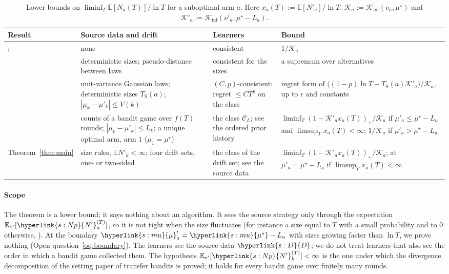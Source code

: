 \documentclass[11pt]{article}
\newcommand{\sy}[2]{\hyperlink{#1}{#2}}
\newcommand{\E}{\mathbb{E}}
\newcommand{\mean}{\sy{s:mu}{\mu}}
\newcommand{\ms}{\sy{s:mu}{\mu^{\star}}}
\newcommand{\Np}{\sy{s:Np}{N'}}
\newcommand{\Dd}{\sy{s:D}{D}}
\begin{document}
\begin{table}[t]
\centering\small
\caption{Lower bounds on $\liminf_T\E[N_a(T)]/\ln T$ for a suboptimal arm $a$. Here
$x_a(T):=\E[N'_a]/\ln T$, $\mathcal K_a:=\mathcal K_{\inf}(\nu_a,\mu^\star)$ and
$\mathcal K'_a:=\mathcal K_{\inf}(\nu'_a,\mu^\star-L_a)$.}\label{tab:comparison}
\begin{tabular}{@{}p{}p{}p{}p{}@{}}
\toprule
\raggedright Result & \raggedright Source data and drift & \raggedright Learners & Bound \\
\midrule
\raggedright \citet{LR85,BK96}; \citet[Thm.~1]{GMS19} & \raggedright none & \raggedright consistent
& $1/\mathcal K_a$ \\
\raggedright \citet[Thm.~3]{PMM25} & \raggedright deterministic sizes; pseudo-distance between laws
& \raggedright consistent for the sizes & a supremum over alternatives \\
\raggedright \citet[Thm.~3]{CL24} & \raggedright unit-variance Gaussian laws; deterministic sizes
$T_{\mathrm S}(a)$; $|\mu_k-\mu'_k|\le V(k)$ & \raggedright $(C,p)$-consistent: regret $\le CT^p$
on the class & regret form of $\big((1-p)\ln T-T_{\mathrm S}(a)\mathcal K'_{a}\big)/\mathcal K_a$, up
to $\epsilon$ and constants \\
\raggedright \citet[Thm.~2]{PMRM26} & \raggedright counts of a bandit game over $f(T)$ rounds;
$|\mu_k-\mu'_k|\le L_k$; a unique optimal arm, arm $1$ ($\mu_1=\mu^\star$) & \raggedright the
class $\mathcal C_L$; see the ordered prior history &
$\liminf_T(1-\mathcal K'_ax_a(T))_+/\mathcal K_a$ if $\mu'_a\le\mu^\star-L_a$ and
$\limsup_Tx_a(T)<\infty$; $1/\mathcal K_a$ if $\mu'_a>\mu^\star-L_a$ \\
\raggedright Theorem~\ref{thm:main} & \raggedright size rules, $\E N'_k<\infty$; four drift sets,
one- or two-sided & \raggedright the class of the drift set; see the source data &
$\liminf_T(1-\mathcal K'_ax_a(T))_+/\mathcal K_a$; at $\mu'_a=\mu^\star-L_a$ if
$\limsup_Tx_a(T)<\infty$ \\
\bottomrule
\end{tabular}
\end{table}

\paragraph{Scope} The theorem is a lower bound; it says nothing about an algorithm. It sees the
source strategy only through the expectation $\E_{\nu'}[\Np^{(T)}_a]$, so it is not tight when the
size fluctuates (for instance a size equal to $T$ with a small probability and to $0$ otherwise,
\citealp[Section~4.2]{PMRM26}). At the boundary $\mean'_a=\ms-L_a$ with sizes growing faster than
$\ln T$, we prove nothing (Open question~\ref{oq:boundary}). The learners see the source data
$\Dd$; we do not treat learners that also see the order in which a bandit game collected them.
The hypothesis $\E_{\nu'}[\Np^{(T)}_k]<\infty$ is the one under which the divergence decomposition
of the setting paper of transfer bandits \citep[Theorem~4.1]{INC-P003} is proved; it holds for every bandit game over finitely many rounds.
\end{document}
